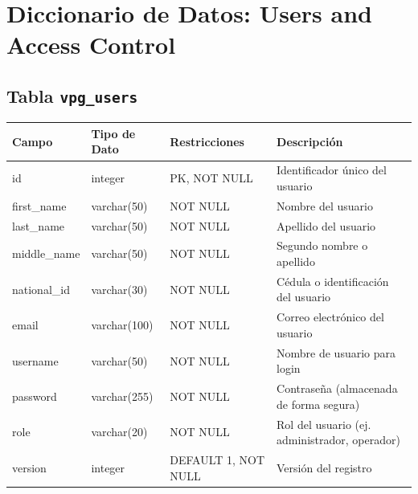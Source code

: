 \section{Diccionario de Datos: Users and Access Control}
\begin{center}


	\subsection{Tabla \texttt{vpg\_users}}
	\small
	\begin{tabular}{|l|l|l|p{6cm}|}
		\hline
		\textbf{Campo} & \textbf{Tipo de Dato} & \textbf{Restricciones} & \textbf{Descripción}                          \\
		\hline
		id             & integer               & PK, NOT NULL           & Identificador único del usuario               \\
		first\_name    & varchar(50)           & NOT NULL               & Nombre del usuario                            \\
		last\_name     & varchar(50)           & NOT NULL               & Apellido del usuario                          \\
		middle\_name   & varchar(50)           & NOT NULL               & Segundo nombre o apellido                     \\
		national\_id   & varchar(30)           & NOT NULL               & Cédula o identificación del usuario           \\
		email          & varchar(100)          & NOT NULL               & Correo electrónico del usuario                \\
		username       & varchar(50)           & NOT NULL               & Nombre de usuario para login                  \\
		password       & varchar(255)          & NOT NULL               & Contraseña (almacenada de forma segura)       \\
		role           & varchar(20)           & NOT NULL               & Rol del usuario (ej. administrador, operador) \\
		version        & integer               & DEFAULT 1, NOT NULL    & Versión del registro                          \\
		\hline
	\end{tabular}
	\normalsize


\end{center}
